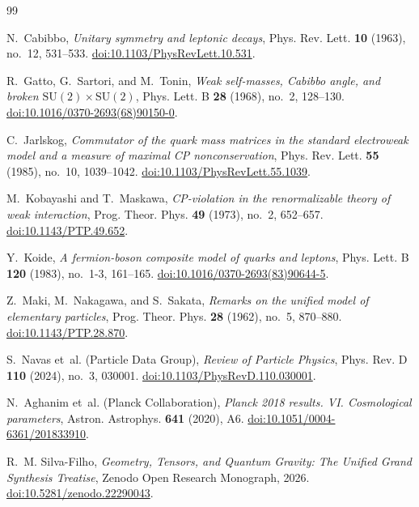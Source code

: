 \documentclass[11pt,reqno]{amsart}
\theoremstyle{definition}
\begin{document}
\begin{thebibliography}{99}

N.~Cabibbo,
\emph{Unitary symmetry and leptonic decays},
Phys. Rev. Lett. \textbf{10} (1963), no.~12, 531--533.
\href{https://doi.org/10.1103/PhysRevLett.10.531}{doi:10.1103/PhysRevLett.10.531}.

R.~Gatto, G.~Sartori, and M.~Tonin,
\emph{Weak self-masses, Cabibbo angle, and broken $\mathrm{SU}(2) \times \mathrm{SU}(2)$},
Phys. Lett. B \textbf{28} (1968), no.~2, 128--130.
\href{https://doi.org/10.1016/0370-2693(68)90150-0}{doi:10.1016/0370-2693(68)90150-0}.

C.~Jarlskog,
\emph{Commutator of the quark mass matrices in the standard electroweak model and a measure of maximal CP nonconservation},
Phys. Rev. Lett. \textbf{55} (1985), no.~10, 1039--1042.
\href{https://doi.org/10.1103/PhysRevLett.55.1039}{doi:10.1103/PhysRevLett.55.1039}.

M.~Kobayashi and T.~Maskawa,
\emph{CP-violation in the renormalizable theory of weak interaction},
Prog. Theor. Phys. \textbf{49} (1973), no.~2, 652--657.
\href{https://doi.org/10.1143/PTP.49.652}{doi:10.1143/PTP.49.652}.

Y.~Koide,
\emph{A fermion-boson composite model of quarks and leptons},
Phys. Lett. B \textbf{120} (1983), no.~1-3, 161--165.
\href{https://doi.org/10.1016/0370-2693(83)90644-5}{doi:10.1016/0370-2693(83)90644-5}.

Z.~Maki, M.~Nakagawa, and S.~Sakata,
\emph{Remarks on the unified model of elementary particles},
Prog. Theor. Phys. \textbf{28} (1962), no.~5, 870--880.
\href{https://doi.org/10.1143/PTP.28.870}{doi:10.1143/PTP.28.870}.

S.~Navas et~al. (Particle Data Group),
\emph{Review of Particle Physics},
Phys. Rev. D \textbf{110} (2024), no.~3, 030001.
\href{https://doi.org/10.1103/PhysRevD.110.030001}{doi:10.1103/PhysRevD.110.030001}.

N.~Aghanim et~al. (Planck Collaboration),
\emph{Planck 2018 results. VI. Cosmological parameters},
Astron. Astrophys. \textbf{641} (2020), A6.
\href{https://doi.org/10.1051/0004-6361/201833910}{doi:10.1051/0004-6361/201833910}.

R.~M. Silva-Filho,
\emph{Geometry, Tensors, and Quantum Gravity: The Unified Grand Synthesis Treatise},
Zenodo Open Research Monograph, 2026.
\href{https://doi.org/10.5281/zenodo.22290043}{doi:10.5281/zenodo.22290043}.


\end{thebibliography}
\end{document}
